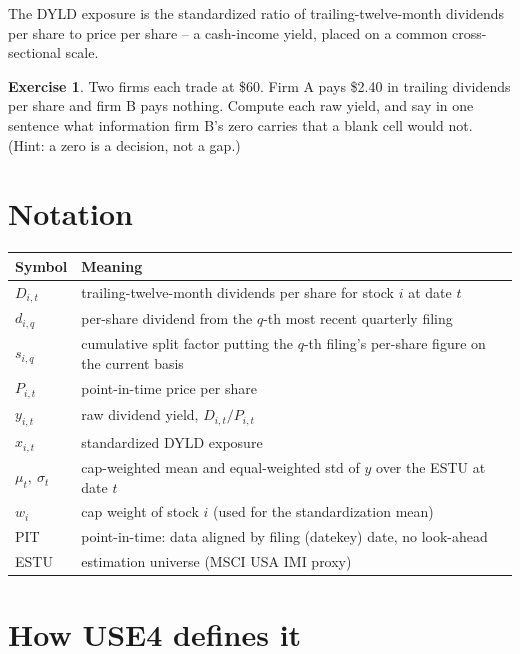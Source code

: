 \documentclass[11pt]{article}
\theoremstyle{definition}
\newtheorem{exercise}{Exercise}[section]
\theoremstyle{plain}
\theoremstyle{remark}
\begin{document}
\begin{keyresult}
The DYLD exposure is the standardized ratio of trailing-twelve-month dividends per share to price per share -- a cash-income yield, placed on a common cross-sectional scale.
\end{keyresult}

\begin{exercise}
Two firms each trade at \$60. Firm A pays \$2.40 in trailing dividends per share and firm B pays nothing. Compute each raw yield, and say in one sentence what information firm B's zero carries that a blank cell would not. (Hint: a zero is a decision, not a gap.)
\end{exercise}

\section*{Notation}

\begin{center}
\begin{tabular}{ll}
\toprule
Symbol & Meaning \\
\midrule
$D_{i,t}$ & trailing-twelve-month dividends per share for stock $i$ at date $t$ \\
$d_{i,q}$ & per-share dividend from the $q$-th most recent quarterly filing \\
$s_{i,q}$ & cumulative split factor putting the $q$-th filing's per-share figure on the current basis \\
$P_{i,t}$ & point-in-time price per share \\
$y_{i,t}$ & raw dividend yield, $D_{i,t}/P_{i,t}$ \\
$x_{i,t}$ & standardized DYLD exposure \\
$\mu_t,\ \sigma_t$ & cap-weighted mean and equal-weighted std of $y$ over the ESTU at date $t$ \\
$w_i$ & cap weight of stock $i$ (used for the standardization mean) \\
PIT & point-in-time: data aligned by filing (datekey) date, no look-ahead \\
ESTU & estimation universe (MSCI USA IMI proxy) \\
\bottomrule
\end{tabular}
\end{center}

\section{How USE4 defines it}\label{sec:def}
\end{document}
